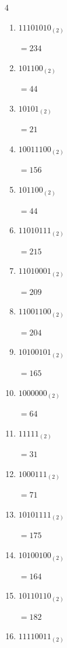\begin{multicols}{4}
\begin{enumerate}
        $=128$

  \item $11101010_{(2)}$

        $=234$

  \item $101100_{(2)}$

        $=44$

  \item $10101_{(2)}$

        $=21$

  \item $10011100_{(2)}$

        $=156$

  \item $101100_{(2)}$

        $=44$

  \item $11010111_{(2)}$

        $=215$

  \item $11010001_{(2)}$

        $=209$

  \item $11001100_{(2)}$

        $=204$

  \item $10100101_{(2)}$

        $=165$

\columnbreak %

\resetques

  \item $1000000_{(2)}$

        $=64$

  \item $11111_{(2)}$

        $=31$

  \item $1000111_{(2)}$

        $=71$

  \item $10101111_{(2)}$

        $=175$

  \item $10100100_{(2)}$

        $=164$

  \item $10110110_{(2)}$

        $=182$

  \item $11110011_{(2)}$


\end{enumerate}
\end{multicols}
